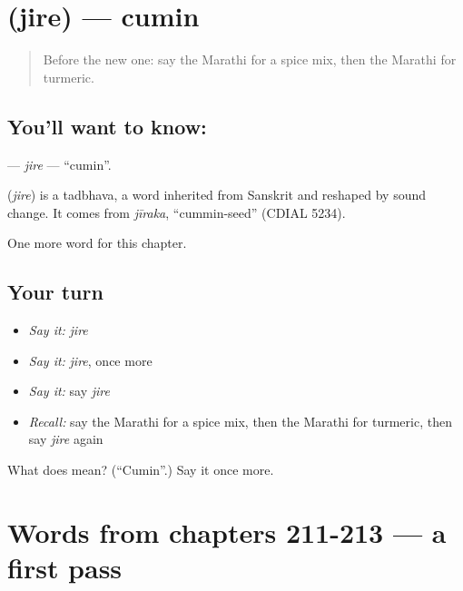 \section[\texorpdfstring{\mr{जिरे} (jire)}{जिरे (jire)}]{ (jire) — cumin}

\label{lesson:MR-C216-jire}



\begin{quote}
Before the new one: say the Marathi for a spice mix, then the Marathi for turmeric.
\end{quote}

\subsection*{You'll want to know: }
\textbf{} — \emph{jire} — \textquotedblleft{}cumin\textquotedblright{}.

\begin{cousinweb}
\textbf{} (\emph{jire}) is a tadbhava, a word inherited from Sanskrit and reshaped by sound change. It comes from \emph{jīraka}, \textquotedblleft{}cummin-seed\textquotedblright{} (CDIAL 5234).
\end{cousinweb}

\begin{grammarlens}[title={What you've built}]
One more word for this chapter.
\end{grammarlens}

\subsection*{Your turn}
\begin{itemize}
\raggedright
  \item \emph{Say it:} \emph{jire}
  \item \emph{Say it:} \emph{jire}, once more
  \item \emph{Say it:} say \emph{jire}
  \item \emph{Recall:} say the Marathi for a spice mix, then the Marathi for turmeric, then say \emph{jire} again
\end{itemize}

\begin{tcolorbox}[breakable,colback=teal!4,colframe=teal!35!black,title={Before you move on}]
What does  mean? (\textquotedblleft{}Cumin\textquotedblright{}.) Say it once more.
\end{tcolorbox}
\section[(dialogue)]{Words from chapters 211-213 — a first pass}

